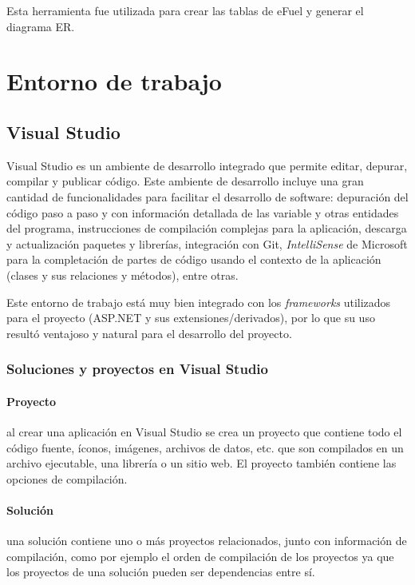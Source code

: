 Esta herramienta fue utilizada para crear las tablas de eFuel y generar el diagrama ER.

\section{Entorno de trabajo}
\subsection{Visual Studio} \label{visualStudio}
Visual Studio es un ambiente de desarrollo integrado que permite editar, depurar, compilar y publicar código. \cite{visualStudioMicrosoft} Este ambiente de desarrollo incluye una gran cantidad de funcionalidades para facilitar el desarrollo de software: depuración del código paso a paso y con información detallada de las variable y otras entidades del programa, instrucciones de compilación complejas para la aplicación, descarga y actualización paquetes y librerías, integración con Git, \textit{IntelliSense} de Microsoft para la completación de partes de código usando el contexto de la aplicación (clases y sus relaciones y métodos), entre otras.

Este entorno de trabajo está muy bien integrado con los \textit{frameworks} utilizados para el proyecto (ASP.NET y sus extensiones/derivados), por lo que su uso resultó ventajoso y natural para el desarrollo del proyecto.

\subsubsection{Soluciones y proyectos en Visual Studio}
\paragraph{Proyecto} al crear una aplicación en Visual Studio se crea un proyecto que contiene todo el código fuente, íconos, imágenes, archivos de datos, etc. que son compilados en un archivo ejecutable, una librería o un sitio web. El proyecto también contiene las opciones de compilación. \cite{visualStudioSolutionMicrosoft}
\paragraph{Solución} una solución contiene uno o más proyectos relacionados, junto con información de compilación, como por ejemplo el orden de compilación de los proyectos ya que los proyectos de una solución pueden ser dependencias entre sí. \cite{visualStudioSolutionMicrosoft}

